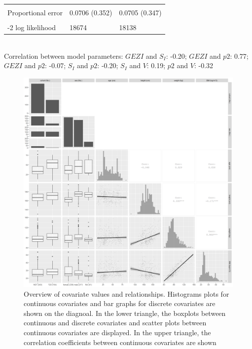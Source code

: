 \documentclass[utf8]{frontiersSCNS} %
\begin{document}
\begin{table}[h]
\begin{tabular}{lll}
                              &               &               \\
Proportional error  & 0.0706 (0.352)                            & 0.0705 (0.347) \\                        \\
-2 log likelihood             & 18674       & 18138       \\ \hline
\end{tabular}\\

Correlation between model parameters: $GEZI$ and $S_I$: -0.20; $GEZI$ and $p2$: 0.77; $GEZI$ and $p2$: -0.07; $S_I$ and $p2$: -0.20; $S_I$ and $V$: 0.19; $p2$ and $V$: -0.32
\end{table}

\begin{figure}[h!]
\begin{center}
\includegraphics[width=15cm]{p2.PNG}
\end{center}
\caption{Overview of covariate values and relationships. Histograms plots for continuous covariates and bar graphs for discrete covariates are shown on the diagnoal. In the lower triangle, the boxplots between continuous and discrete covariates and scatter plots between continuous covariates are displayed. In the upper triangle, the correlation coefficients between continuous covariates are shown}
\label{fig: cova}
\end{figure}
\end{document}
